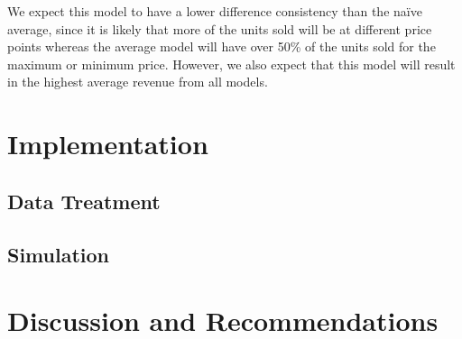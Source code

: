 \documentclass[11pt,a4paper]{article}
\begin{document}
We expect this model to have a lower difference consistency than the naïve average, since it is likely that more of the units sold will be at different price points whereas the average model will have over 50\% of the units sold for the maximum or minimum price. 
However, we also expect that this model will result in the highest average revenue from all models.

\section{Implementation}

\subsection{Data Treatment}

\subsection{Simulation}

\section{Discussion and Recommendations}

\pagebreak


\end{document}
